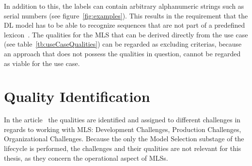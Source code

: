 In addition to this, the labels can contain arbitrary alphanumeric strings such as serial numbers
(see figure~\ref{fig:examples}).
This results in the requirement that the \ac{DL} model has to be able to recognize sequences that
are not part of a predefined lexicon~\citep{ghosh_visual_2017}.
The qualities for the \ac{MLS} that can be derived directly from the use case (see
table~\ref{tb:useCaseQualities}) can be regarded as excluding criterias, because an approach
that does not possess the qualities in question, cannot be regarded as viable for the use case.

\section{Quality Identification}
In the article~\cite{ashmore_assuring_2021} the qualities are identified and assigned to different
challenges in regards to working with \ac{MLS}: Development Challenges, Production Challenges,
Organizational Challenges.
Because the only the Model Selection substage of the lifecycle is performed, the challenges and their
qualities are not relevant for this thesis, as they concern the operational aspect of \acp{MLS}.


